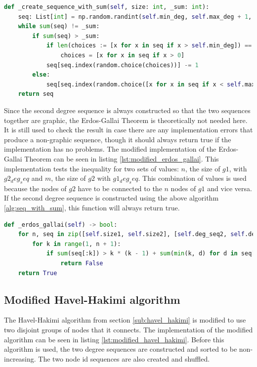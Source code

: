 \begin{lstlisting}[language=python, caption={Algorithm for creating a sequence with specific sum}, label={lst:seq_with_sum}]
def _create_sequence_with_sum(self, size: int, _sum: int):
    seq: List[int] = np.random.randint(self.min_deg, self.max_deg + 1, size=(size)).tolist()
    while sum(seq) != _sum:
        if sum(seq) > _sum:
            if len(choices := [x for x in seq if x > self.min_deg]) == 0:
                choices = [x for x in seq if x > 0]
            seq[seq.index(random.choice(choices))] -= 1
        else:
            seq[seq.index(random.choice([x for x in seq if x < self.max_deg]))] += 1
    return seq
\end{lstlisting}

Since the second degree sequence is always constructed so that the two sequences together are graphic, the Erdos-Gallai Theorem is theoretically not needed here. It is still used to check the result in case there are any implementation errors that produce a non-graphic sequence, though it should always return true if the implementation has no problems. The modified implementation of the Erdos-Gallai Theorem can be seen in listing \ref{lst:modified_erdos_gallai}. This implementation tests the inequality for two sets of values: $n$, the size of $g1$, with $g2_deg_seq$ and $m$, the size of $g2$ with $g1_deg_seq$. This combination of values is used because the nodes of $g2$ have to be connected to the $n$ nodes of $g1$ and vice versa. If the second degree sequence is constructed using the above algorithm \ref{alg:seq_with_sum}, this function will always return true.

\begin{lstlisting}[language=python, caption={Modified Erdos-Gallai Theorem for connecting to disjunct groups}, label={lst:modified_erdos_gallai}]
def _erdos_gallai(self) -> bool:
    for n, seq in zip([self.size1, self.size2], [self.deg_seq2, self.deg_seq1]):
        for k in range(1, n + 1):
            if sum(seq[:k]) > k * (k - 1) + sum(min(k, d) for d in seq[k + 1 :]):
                return False
    return True
\end{lstlisting}



\subsection{Modified Havel-Hakimi algorithm}
The Havel-Hakimi algorithm from section \ref{sub:havel_hakimi} is modified to use two disjoint groups of nodes that it connects. The implementation of the modified algorithm can be seen in listing \ref{lst:modified_havel_hakimi}. Before this algorithm is used, the two degree sequences are constructed and sorted to be non-increasing. The two node id sequences are also created and shuffled.

